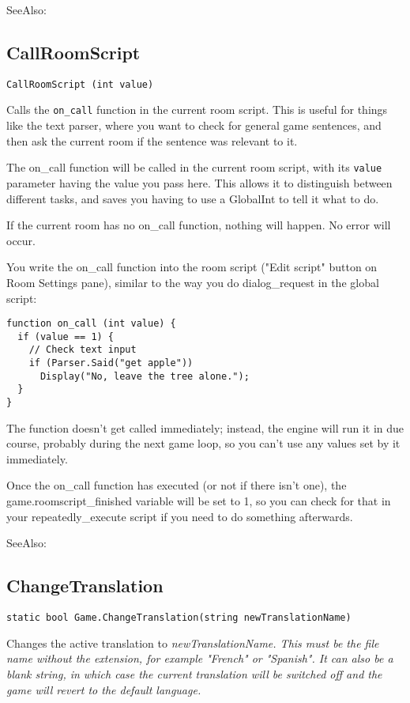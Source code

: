 SeeAlso: 


\subsection{CallRoomScript}\label{CallRoomScript}%

\begin{verbatim}
CallRoomScript (int value)
\end{verbatim}

Calls the \verb$on_call$ function in the current room script. This is useful for things
like the text parser, where you want to check for general game sentences, and then ask
the current room if the sentence was relevant to it.

The on_call function will be called in the current room script, with its \verb$value$
parameter having the value you pass here. This allows it to distinguish between different
tasks, and saves you having to use a GlobalInt to tell it what to do.

If the current room has no on_call function, nothing will happen. No error will occur.

You write the on_call function into the room script ("Edit script" button on Room Settings
pane), similar to the way you do dialog_request in the global script:
\begin{verbatim}
function on_call (int value) {
  if (value == 1) {
    // Check text input
    if (Parser.Said("get apple"))
      Display("No, leave the tree alone.");
  }
}
\end{verbatim}

The function doesn't get called immediately; instead, the engine will run it in due course,
probably during the next game loop, so you can't use any values set by it immediately.

Once the on_call function has executed (or not if there isn't one), the
game.roomscript_finished  variable will be set to 1, so you can check for that in your
repeatedly_execute script if you need to do something afterwards.

SeeAlso: 


\subsection{ChangeTranslation}\label{Game.ChangeTranslation}%

\begin{verbatim}
static bool Game.ChangeTranslation(string newTranslationName)
\end{verbatim}
Changes the active translation to \it{newTranslationName}. This must be the file name without
the extension, for example "French" or "Spanish". It can also be a blank string, in which case
the current translation will be switched off and the game will revert to the default language.

